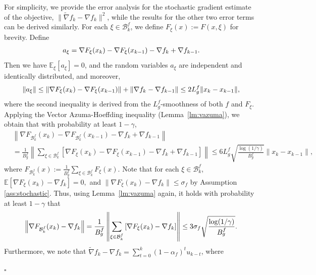 \documentclass[10pt,a4paper]{amsart}
\newenvironment{proof}{{\noindent\it Proof.}\quad}{\hfill $\square$\par}
\begin{document}
\begin{proof}
    For simplicity, we provide the error analysis for the stochastic gradient estimate of the objective, $\|\tilde{\nabla} f_k - \nabla f_k\|^2$, while the results for the other two error terms can be derived similarly. For each $\xi \in \mathcal{B}_k^f$, we define $F_\xi(x) := F(x, \xi)$ for brevity. Define
    \begin{align}
    a_\xi = \nabla F_\xi(x_k) - \nabla F_\xi(x_{k-1}) - \nabla f_k + \nabla f_{k-1}. \notag
    \end{align}
    Then we have  $\mathbb{E}_\xi[a_\xi] = 0$, and the random variables $a_\xi$ are independent and identically distributed, and moreover, 
    \begin{align}
    \|a_\xi\| \leq \|\nabla F_\xi(x_k) - \nabla F_\xi(x_{k-1})\| + \|\nabla f_k - \nabla f_{k-1}\| \leq 2 L_g^f \|x_k - x_{k-1}\|, \notag
    \end{align}
    where the second inequality is  derived from the $L_g^f$-smoothness of both $f$ and $F_\xi$. 
    Applying the Vector Azuma-Hoeffding inequality (Lemma~\ref{lm:vazuma}),  we obtain that with probability at least $1 - \gamma$,  
    \begin{align*}  
        & \left\| \nabla F_{\mathcal{B}_k^f}(x_k) - \nabla F_{\mathcal{B}_k^f}(x_{k-1}) - \nabla f_k + \nabla f_{k-1} \right\| \\  
        &= \frac{1}{B_g^f} \left\| \sum_{\xi \in \mathcal{B}_k^f} \left[ \nabla F_\xi(x_k) - \nabla F_\xi(x_{k-1}) - \nabla f_k + \nabla f_{k-1} \right] \right\|  
        \leq 6 L_g^f \sqrt{\frac{\log(1/\gamma)}{B_g^f}} \|x_k - x_{k-1}\|,
    \end{align*}  
    where $F_{\mathcal{B}_k^f}(x) := \frac{1}{B_g^f} \sum_{\xi \in \mathcal{B}_k^f} F_\xi(x)$.  
    Note that for each $\xi \in \mathcal{B}_k^f$,   
    \( 
    \mathbb{E}[\nabla F_\xi(x_k) - \nabla f_k] = 0, 
    \) 
    and $\|\nabla F_\xi(x_k) - \nabla f_k\| \leq \sigma_f$ by Assumption \ref{ass:stochastic}.  
    Thus, using Lemma~\ref{lm:vazuma} again, it holds with probability at least $1 - \gamma$  that  
    \begin{align}  
        \left\| \nabla F_{\mathcal{B}_k^f}(x_k) - \nabla f_k \right\| = \frac{1}{B_g^f} \left\| \sum_{\xi \in \mathcal{B}_k^f} \left[ \nabla F_\xi(x_k) - \nabla f_k \right] \right\| \leq 3 \sigma_f \sqrt{\frac{\log(1/\gamma)}{B_g^f}}.\notag  
    \end{align}  
    Furthermore, we note that $\tilde \nabla f_k - \nabla f_k = \sum_{t=0}^k (1 - \alpha_f)^t u_{k-t}$, where  

\end{proof}
\end{document}

